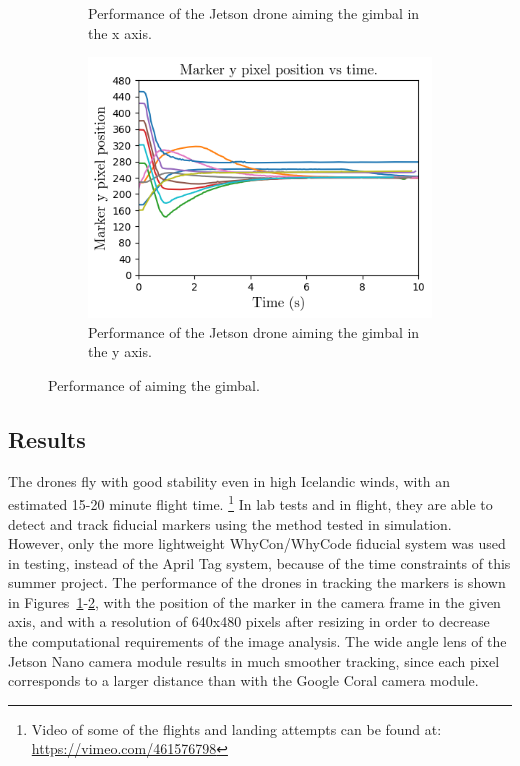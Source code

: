\begin{figure}
\begin{subfigure}[b]{0.49\textwidth}
    \caption{Performance of the Jetson drone aiming the gimbal in the x axis.}
    \label{figure:jetson_gimbal_performance_x_axis}
    \end{subfigure}
    \begin{subfigure}[b]{0.49\textwidth}
        \centering
        \includegraphics[width=\textwidth]{images/jetson_gimbal_performance_y_axis.png}
    \caption{Performance of the Jetson drone aiming the gimbal in the y axis.}
    \label{figure:jetson_gimbal_performance_y_axis}
    \end{subfigure}
    \caption{Performance of aiming the gimbal.}
    \label{figure:jetson_drone}
\end{figure}

\subsection{Results}

The drones fly with good stability even in high Icelandic winds, with an estimated 15-20 minute flight time.
\footnote{Video of some of the flights and landing attempts can be found at:
\href{https://vimeo.com/461576798}{https://vimeo.com/461576798}}
In lab tests and in flight, they are able to detect and track fiducial markers using the method
tested in simulation.
However, only the more lightweight WhyCon/WhyCode fiducial system was used in testing, instead of the
April Tag system, because of the time constraints of this summer project.
The performance of the drones in tracking the markers is shown in Figures~\ref{figure:jetson_gimbal_performance_x_axis}-\ref{figure:jetson_gimbal_performance_y_axis},
with the position of the marker in the camera frame in the given axis,
and with a resolution of 640x480 pixels after resizing in order to decrease the computational requirements
of the image analysis.
The wide angle lens of the Jetson Nano camera module results in much smoother tracking,
since each pixel corresponds to a larger distance than with the Google Coral camera module.

